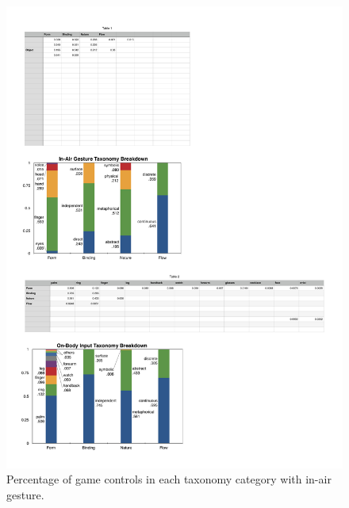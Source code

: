 \documentclass{sigchi}
\begin{document}
 \begin{figure}[!h]
  \centering
  \includegraphics[width=1\columnwidth]{InAirTaxonomy.pdf}
  \caption{Percentage of game controls in each taxonomy category with in-air gesture.}
  \label{fig:InAirTaxonomy}
  \end{figure} 
\end{document}
